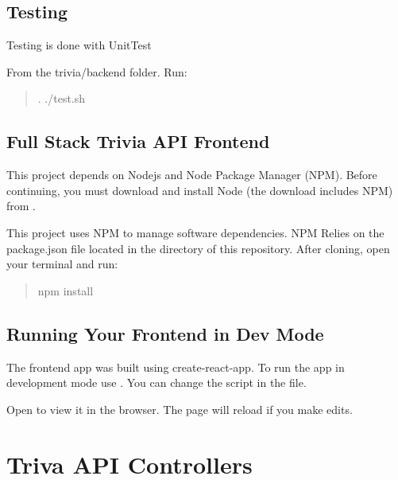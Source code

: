 \documentclass[letterpaper,10pt,english]{sphinxmanual}
\begin{document}
\section{Testing}
\label{\detokenize{index:testing}}
Testing is done with UnitTest

From the trivia/backend folder. Run:
\begin{quote}

\begin{sphinxVerbatim}[commandchars=\\\{\}]
. ./test.sh
\end{sphinxVerbatim}
\end{quote}


\section{Full Stack Trivia API Frontend}
\label{\detokenize{index:full-stack-trivia-api-frontend}}
This project depends on Nodejs and Node Package Manager (NPM). Before continuing, you must download and install Node (the download includes NPM) from .

This project uses NPM to manage software dependencies. NPM Relies on the package.json file located in the  directory of this repository. After cloning, open your terminal and run:
\begin{quote}

\begin{sphinxVerbatim}[commandchars=\\\{\}]
npm install
\end{sphinxVerbatim}
\end{quote}


\section{Running Your Frontend in Dev Mode}
\label{\detokenize{index:running-your-frontend-in-dev-mode}}
The frontend app was built using create-react-app. To run the app in development mode use . You can change the script in the  file.

Open  to view it in the browser. The page will reload if you make edits.


\chapter{Triva API Controllers}
\label{\detokenize{index:module-controller}}\label{\detokenize{index:triva-api-controllers}}
\end{document}
